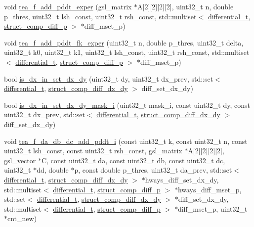 \begin{DoxyCompactItemize}
\item 
void \hyperlink{tea-f-add-pddt_8cc_ad6e23f144fd280b089361de9cad58121}{tea\-\_\-f\-\_\-add\-\_\-pddt\-\_\-exper} (gsl\-\_\-matrix $\ast$\-A\mbox{[}2\mbox{]}\mbox{[}2\mbox{]}\mbox{[}2\mbox{]}\mbox{[}2\mbox{]}, uint32\-\_\-t n, double p\-\_\-thres, uint32\-\_\-t lsh\-\_\-const, uint32\-\_\-t rsh\-\_\-const, std\-::multiset$<$ \hyperlink{structdifferential__t}{differential\-\_\-t}, \hyperlink{structstruct__comp__diff__p}{struct\-\_\-comp\-\_\-diff\-\_\-p} $>$ $\ast$diff\-\_\-mset\-\_\-p)
\item 
void \hyperlink{tea-f-add-pddt_8cc_a630bf3eeaef1d61366bfc0ab790f6ab7}{tea\-\_\-f\-\_\-add\-\_\-pddt\-\_\-fk\-\_\-exper} (uint32\-\_\-t n, double p\-\_\-thres, uint32\-\_\-t delta, uint32\-\_\-t k0, uint32\-\_\-t k1, uint32\-\_\-t lsh\-\_\-const, uint32\-\_\-t rsh\-\_\-const, std\-::multiset$<$ \hyperlink{structdifferential__t}{differential\-\_\-t}, \hyperlink{structstruct__comp__diff__p}{struct\-\_\-comp\-\_\-diff\-\_\-p} $>$ $\ast$diff\-\_\-mset\-\_\-p)
\item 
bool \hyperlink{tea-f-add-pddt_8cc_a82603f2a5c7ada2fad8d82f93287ff05}{is\-\_\-dx\-\_\-in\-\_\-set\-\_\-dx\-\_\-dy} (uint32\-\_\-t dy, uint32\-\_\-t dx\-\_\-prev, std\-::set$<$ \hyperlink{structdifferential__t}{differential\-\_\-t}, \hyperlink{structstruct__comp__diff__dx__dy}{struct\-\_\-comp\-\_\-diff\-\_\-dx\-\_\-dy} $>$ diff\-\_\-set\-\_\-dx\-\_\-dy)
\item 
bool \hyperlink{tea-f-add-pddt_8cc_ab10ee9dcd6009603e4e6fb99f3285873}{is\-\_\-dx\-\_\-in\-\_\-set\-\_\-dx\-\_\-dy\-\_\-mask\-\_\-i} (uint32\-\_\-t mask\-\_\-i, const uint32\-\_\-t dy, const uint32\-\_\-t dx\-\_\-prev, std\-::set$<$ \hyperlink{structdifferential__t}{differential\-\_\-t}, \hyperlink{structstruct__comp__diff__dx__dy}{struct\-\_\-comp\-\_\-diff\-\_\-dx\-\_\-dy} $>$ diff\-\_\-set\-\_\-dx\-\_\-dy)
\item 
void \hyperlink{tea-f-add-pddt_8cc_a8139a197e7fe5a69368a2746bc4e6ca5}{tea\-\_\-f\-\_\-da\-\_\-db\-\_\-dc\-\_\-add\-\_\-pddt\-\_\-i} (const uint32\-\_\-t k, const uint32\-\_\-t n, const uint32\-\_\-t lsh\-\_\-const, const uint32\-\_\-t rsh\-\_\-const, gsl\-\_\-matrix $\ast$\-A\mbox{[}2\mbox{]}\mbox{[}2\mbox{]}\mbox{[}2\mbox{]}\mbox{[}2\mbox{]}, gsl\-\_\-vector $\ast$\-C, const uint32\-\_\-t da, const uint32\-\_\-t db, const uint32\-\_\-t dc, uint32\-\_\-t $\ast$dd, double $\ast$p, const double p\-\_\-thres, uint32\-\_\-t da\-\_\-prev, std\-::set$<$ \hyperlink{structdifferential__t}{differential\-\_\-t}, \hyperlink{structstruct__comp__diff__dx__dy}{struct\-\_\-comp\-\_\-diff\-\_\-dx\-\_\-dy} $>$ $\ast$hways\-\_\-diff\-\_\-set\-\_\-dx\-\_\-dy, std\-::multiset$<$ \hyperlink{structdifferential__t}{differential\-\_\-t}, \hyperlink{structstruct__comp__diff__p}{struct\-\_\-comp\-\_\-diff\-\_\-p} $>$ $\ast$hways\-\_\-diff\-\_\-mset\-\_\-p, std\-::set$<$ \hyperlink{structdifferential__t}{differential\-\_\-t}, \hyperlink{structstruct__comp__diff__dx__dy}{struct\-\_\-comp\-\_\-diff\-\_\-dx\-\_\-dy} $>$ $\ast$diff\-\_\-set\-\_\-dx\-\_\-dy, std\-::multiset$<$ \hyperlink{structdifferential__t}{differential\-\_\-t}, \hyperlink{structstruct__comp__diff__p}{struct\-\_\-comp\-\_\-diff\-\_\-p} $>$ $\ast$diff\-\_\-mset\-\_\-p, uint32\-\_\-t $\ast$cnt\-\_\-new)

\end{DoxyCompactItemize}
